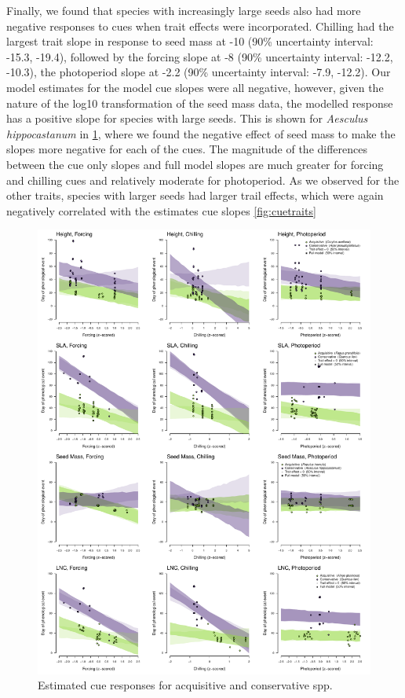 \documentclass{article}\usepackage[]{graphicx}\usepackage[]{color}
\begin{document}
Finally, we found that species with increasingly large seeds also had more negative responses to cues when trait effects were incorporated. Chilling had the largest trait slope in response to seed mass at -10 (90\% uncertainty interval: -15.3, -19.4), followed by the forcing slope at -8 (90\% uncertainty interval: -12.2, -10.3), the photoperiod slope at -2.2 (90\% uncertainty interval: -7.9, -12.2). Our model estimates for the model cue slopes were all negative, however, given the nature of the log10 transformation of the seed mass data, the modelled response has a positive slope for species with large seeds. This is shown for \textit{Aesculus hippocastanum} in \ref{fig:slopes}, where we found the negative effect of seed mass to make the slopes more negative for each of the cues. The magnitude of the differences between the cue only slopes and full model slopes are much greater for forcing and chilling cues and relatively moderate for photoperiod. As we observed for the other traits, species with larger seeds had larger trail effects, which were again negatively correlated with the estimates cue slopes \ref{fig:cuetraits}

\begin{figure}[h!]
    \centering
 \includegraphics[width=\textwidth]{..//..//analyses/traits/figures/slopesConsAcqu.pdf} 
    \caption{Estimated cue responses for acquisitive and conservative spp.}
    \label{fig:slopes}
\end{figure}
\end{document}
